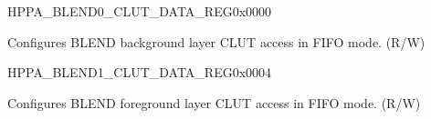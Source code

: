 \begin{register}{H}{PPA\_BLEND0\_CLUT\_DATA\_REG}{0x0000}\label{regdesc:PPABLEND0CLUTDATAREG}
%
\regnewline%
\begin{regdesc}\begin{reglist}
\label{fielddesc:PPARDWRWORDBLEND0CLUT}\item [PPA\_RDWR\_WORD\_BLEND0\_CLUT] Configures BLEND background layer CLUT access in FIFO mode. (R/W)
\end{reglist}\end{regdesc}
\end{register}


\begin{register}{H}{PPA\_BLEND1\_CLUT\_DATA\_REG}{0x0004}\label{regdesc:PPABLEND1CLUTDATAREG}
%
\regnewline%
\begin{regdesc}\begin{reglist}
\label{fielddesc:PPARDWRWORDBLEND1CLUT}\item [PPA\_RDWR\_WORD\_BLEND1\_CLUT] Configures BLEND foreground layer CLUT access in FIFO mode. (R/W)
\end{reglist}\end{regdesc}
\end{register}


